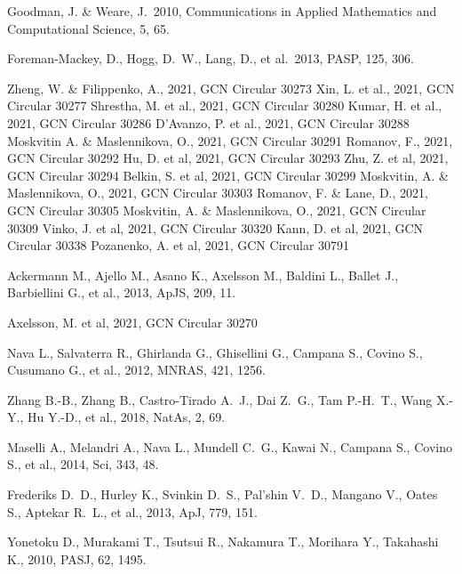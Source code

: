\documentclass{naturesubmissionstyle}
\newcommand\pasp{PASP}               %
\begin{document}
\begin{thebibliography}{10}
 Goodman, J. \& Weare, J.\ 2010, Communications in Applied Mathematics and Computational Science, 5, 65. 

 Foreman-Mackey, D., Hogg, D.~W., Lang, D., et al.\ 2013, \pasp, 125, 306. 




 Zheng, W. \& Filippenko, A., 2021, GCN Circular 30273
 Xin, L. et al., 2021, GCN Circular 30277
 Shrestha, M. et al., 2021, GCN Circular 30280
 Kumar, H. et al., 2021, GCN Circular 30286
 D'Avanzo, P. et al., 2021, GCN Circular 30288
 Moskvitin A. \& Maslennikova, O., 2021, GCN Circular 30291
 Romanov, F., 2021, GCN Circular 30292
 Hu, D. et al, 2021, GCN Circular 30293
 Zhu, Z. et al, 2021, GCN Circular 30294
 Belkin, S. et al, 2021, GCN Circular 30299
 Moskvitin, A. \& Maslennikova, O., 2021, GCN Circular 30303
 Romanov, F. \& Lane, D., 2021, GCN Circular 30305
 Moskvitin, A. \& Maslennikova, O., 2021, GCN Circular 30309
 Vinko, J. et al, 2021, GCN Circular 30320
 Kann, D. et al, 2021, GCN Circular 30338
 Pozanenko, A. et al, 2021, GCN Circular 30791


 Ackermann M., Ajello M., Asano K., Axelsson M., Baldini L., Ballet J., Barbiellini G., et al., 2013, ApJS, 209, 11. 

 Axelsson, M. et al, 2021, GCN Circular 30270 %

 Nava L., Salvaterra R., Ghirlanda G., Ghisellini G., Campana S., Covino S., Cusumano G., et al., 2012, MNRAS, 421, 1256. 

 Zhang B.-B., Zhang B., Castro-Tirado A.~J., Dai Z.~G., Tam P.-H.~T., Wang X.-Y., Hu Y.-D., et al., 2018, NatAs, 2, 69. 

 Maselli A., Melandri A., Nava L., Mundell C.~G., Kawai N., Campana S., Covino S., et al., 2014, Sci, 343, 48. 

 Frederiks D.~D., Hurley K., Svinkin D.~S., Pal'shin V.~D., Mangano V., Oates S., Aptekar R.~L., et al., 2013, ApJ, 779, 151. 

 Yonetoku D., Murakami T., Tsutsui R., Nakamura T., Morihara Y., Takahashi K., 2010, PASJ, 62, 1495. 


\end{thebibliography}
\end{document}
